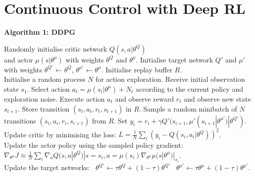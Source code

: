 \documentclass{article}
\begin{document}
\section{Continuous Control with Deep RL}
\textbf{Algorithm 1: DDPG}
\begin{algorithmic}
    \small
\State Randomly initialise critic network $Q(s, a|\theta^Q)$ \\and actor $\mu(s|\theta^\mu)$ with weights $\theta^Q$ and $\theta^\mu$.
\State Initialise target network $Q'$ and $\mu'$ with weights $\theta^{Q'} \leftarrow \theta^Q$, $\theta^{\mu'} \leftarrow \theta^\mu$.
\State Initialise replay buffer $R$.\\
\State Initialise a random process $N$ for action exploration.
\State Receive initial observation state $s_1$.
\State Select action $a_t = \mu(s_t|\theta^\mu) + N_t$ according to
\State the current policy and exploration noise.
\State Execute action $a_t$ and observe reward $r_t$ and observe new state $s_{t+1}$.
\State Store transition $(s_t, a_t, r_t, s_{t+1})$ in $R$.
\State Sample a random minibatch of $N$ transitions $(s_i, a_i, r_i, s_{i+1})$ from $R$.
\State Set $y_i = r_i + \gamma Q'(s_{i+1}, \mu'(s_{i+1}|\theta^{\mu'})|\theta^{Q'})$.\\
\State Update critic by minimising the loss: $L = \frac{1}{N}\sum_i(y_i - Q(s_i, a_i|\theta^Q))^2$.\\
\State Update the actor policy using the sampled policy gradient:
\State $\nabla_{\theta^\mu} J \approx \frac{1}{N}\sum_i \nabla_a Q(s, a|\theta^Q)|{s=s_i,a=\mu(s_i)}\nabla_{\theta^\mu} \mu(s|\theta^\mu)|_{s_i}$.\\
\State Update the target networks: \
\State $\theta^{Q'} \leftarrow \tau \theta^Q + (1 - \tau) \theta^{Q'}$ \
\State $\theta^{\mu'} \leftarrow \tau \theta^\mu + (1 - \tau) \theta^{\mu'}$.
\EndFor
\EndFor
\end{algorithmic}
\end{document}
